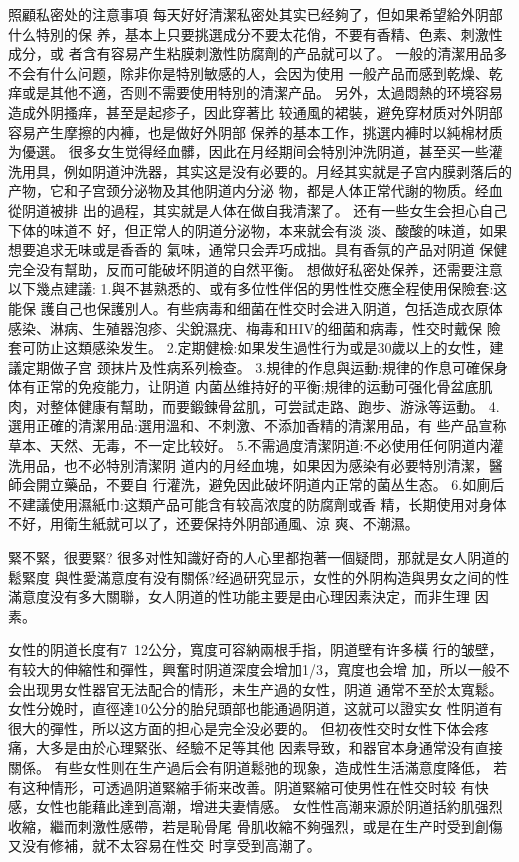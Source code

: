 \documentclass[12pt,UTF8]{ctexbook}
\begin{document}
照顧私密处的注意事項
每天好好清潔私密处其实已经夠了，但如果希望給外阴部什么特別的保
养，基本上只要挑選成分不要太花俏，不要有香精、色素、刺激性成分，或
者含有容易产生粘膜刺激性防腐劑的产品就可以了。
一般的清潔用品多不会有什么问题，除非你是特別敏感的人，会因为使用
一般产品而感到乾燥、乾痒或是其他不適，否则不需要使用特別的清潔产品。
另外，太過悶熱的环境容易造成外阴搔痒，甚至是起疹子，因此穿著比
较通風的裙裝，避免穿材质对外阴部容易产生摩擦的内褲，也是做好外阴部
保养的基本工作，挑選内褲时以純棉材质为優選。
很多女生觉得经血髒，因此在月经期间会特別沖洗阴道，甚至买一些灌
洗用具，例如阴道沖洗器，其实这是没有必要的。月经其实就是子宫内膜剥落后的产物，它和子宫颈分泌物及其他阴道内分泌
物，都是人体正常代謝的物质。经血從阴道被排
出的過程，其实就是人体在做自我清潔了。
还有一些女生会担心自己下体的味道不
好，但正常人的阴道分泌物，本来就会有淡
淡、酸酸的味道，如果想要追求无味或是香香的
氣味，通常只会弄巧成拙。具有香氛的产品对阴道
保健完全没有幫助，反而可能破坏阴道的自然平衡。
想做好私密处保养，还需要注意以下幾点建議:
1.與不甚熟悉的、或有多位性伴侶的男性性交應全程使用保險套:这能保
護自己也保護別人。有些病毒和细菌在性交时会进入阴道，包括造成衣原体
感染、淋病、生殖器泡疹、尖銳濕疣、梅毒和HIV的细菌和病毒，性交时戴保
險套可防止这類感染发生。
2.定期健檢:如果发生過性行为或是30歲以上的女性，建議定期做子宫
颈抹片及性病系列檢查。
3.規律的作息與运動:規律的作息可確保身体有正常的免疫能力，让阴道
内菌丛维持好的平衡;規律的运動可强化骨盆底肌肉，对整体健康有幫助，而要鍛鍊骨盆肌，可尝試走路、跑步、游泳等运動。
4.選用正確的清潔用品:選用溫和、不刺激、不添加香精的清潔用品，有
些产品宣称草本、天然、无毒，不一定比较好。
5.不需過度清潔阴道:不必使用任何阴道内灌洗用品，也不必特別清潔阴
道内的月经血塊，如果因为感染有必要特別清潔，醫師会開立藥品，不要自
行灌洗，避免因此破坏阴道内正常的菌丛生态。
6.如廁后不建議使用濕紙巾:这類产品可能含有较高浓度的防腐劑或香
精，长期使用对身体不好，用衛生紙就可以了，还要保持外阴部通風、涼
爽、不潮濕。

緊不緊，很要緊?
很多对性知識好奇的人心里都抱著一個疑問，那就是女人阴道的鬆緊度
與性愛滿意度有没有關係?经過研究显示，女性的外阴构造與男女之间的性
滿意度没有多大關聯，女人阴道的性功能主要是由心理因素決定，而非生理
因素。

女性的阴道长度有7~12公分，寬度可容納兩根手指，阴道壁有许多橫
行的皱壁，有较大的伸縮性和彈性，興奮时阴道深度会增加1/3，寬度也会增
加，所以一般不会出现男女性器官无法配合的情形，未生产過的女性，阴道
通常不至於太寬鬆。
女性分娩时，直徑達10公分的胎兒頭部也能通過阴道，这就可以證实女
性阴道有很大的彈性，所以这方面的担心是完全没必要的。
但初夜性交时女性下体会疼痛，大多是由於心理緊张、经驗不足等其他
因素导致，和器官本身通常没有直接關係。
有些女性则在生产過后会有阴道鬆弛的现象，造成性生活滿意度降低，
若有这种情形，可透過阴道緊縮手術来改善。阴道緊縮可使男性在性交时较
有快感，女性也能藉此達到高潮，增进夫妻情感。
女性性高潮来源於阴道括約肌强烈收縮，繼而刺激性感帶，若是恥骨尾
骨肌收縮不夠强烈，或是在生产时受到創傷又没有修補，就不太容易在性交
时享受到高潮了。
\end{document}
